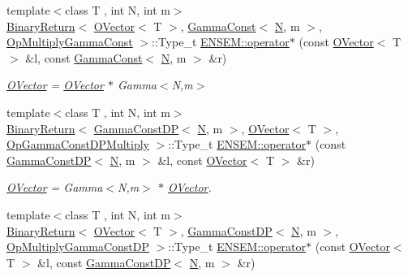 \begin{DoxyCompactItemize}
{\footnotesize template$<$class T , int N, int m$>$ }\\\mbox{\hyperlink{structENSEM_1_1BinaryReturn}{Binary\+Return}}$<$ \mbox{\hyperlink{classENSEM_1_1OVector}{O\+Vector}}$<$ T $>$, \mbox{\hyperlink{classENSEM_1_1GammaConst}{Gamma\+Const}}$<$ \mbox{\hyperlink{adat__devel_2lib_2hadron_2operator__name__util_8cc_a7722c8ecbb62d99aee7ce68b1752f337}{N}}, m $>$, \mbox{\hyperlink{structENSEM_1_1OpMultiplyGammaConst}{Op\+Multiply\+Gamma\+Const}} $>$\+::Type\+\_\+t \mbox{\hyperlink{group__obsvector_ga4cead70d208b90a7a2b58aa6251d78b0}{E\+N\+S\+E\+M\+::operator$\ast$}} (const \mbox{\hyperlink{classENSEM_1_1OVector}{O\+Vector}}$<$ T $>$ \&l, const \mbox{\hyperlink{classENSEM_1_1GammaConst}{Gamma\+Const}}$<$ \mbox{\hyperlink{adat__devel_2lib_2hadron_2operator__name__util_8cc_a7722c8ecbb62d99aee7ce68b1752f337}{N}}, m $>$ \&r)
\begin{DoxyCompactList}\small\item\em \mbox{\hyperlink{classENSEM_1_1OVector}{O\+Vector}} = \mbox{\hyperlink{classENSEM_1_1OVector}{O\+Vector}} $\ast$ Gamma$<$\+N,m$>$ \end{DoxyCompactList}\item 
{\footnotesize template$<$class T , int N, int m$>$ }\\\mbox{\hyperlink{structENSEM_1_1BinaryReturn}{Binary\+Return}}$<$ \mbox{\hyperlink{classENSEM_1_1GammaConstDP}{Gamma\+Const\+DP}}$<$ \mbox{\hyperlink{adat__devel_2lib_2hadron_2operator__name__util_8cc_a7722c8ecbb62d99aee7ce68b1752f337}{N}}, m $>$, \mbox{\hyperlink{classENSEM_1_1OVector}{O\+Vector}}$<$ T $>$, \mbox{\hyperlink{structENSEM_1_1OpGammaConstDPMultiply}{Op\+Gamma\+Const\+D\+P\+Multiply}} $>$\+::Type\+\_\+t \mbox{\hyperlink{group__obsvector_gaa96dcdea35ea89a0405ab2273dfaa9a9}{E\+N\+S\+E\+M\+::operator$\ast$}} (const \mbox{\hyperlink{classENSEM_1_1GammaConstDP}{Gamma\+Const\+DP}}$<$ \mbox{\hyperlink{adat__devel_2lib_2hadron_2operator__name__util_8cc_a7722c8ecbb62d99aee7ce68b1752f337}{N}}, m $>$ \&l, const \mbox{\hyperlink{classENSEM_1_1OVector}{O\+Vector}}$<$ T $>$ \&r)
\begin{DoxyCompactList}\small\item\em \mbox{\hyperlink{classENSEM_1_1OVector}{O\+Vector}} = Gamma$<$\+N,m$>$ $\ast$ \mbox{\hyperlink{classENSEM_1_1OVector}{O\+Vector}}. \end{DoxyCompactList}\item 
{\footnotesize template$<$class T , int N, int m$>$ }\\\mbox{\hyperlink{structENSEM_1_1BinaryReturn}{Binary\+Return}}$<$ \mbox{\hyperlink{classENSEM_1_1OVector}{O\+Vector}}$<$ T $>$, \mbox{\hyperlink{classENSEM_1_1GammaConstDP}{Gamma\+Const\+DP}}$<$ \mbox{\hyperlink{adat__devel_2lib_2hadron_2operator__name__util_8cc_a7722c8ecbb62d99aee7ce68b1752f337}{N}}, m $>$, \mbox{\hyperlink{structENSEM_1_1OpMultiplyGammaConstDP}{Op\+Multiply\+Gamma\+Const\+DP}} $>$\+::Type\+\_\+t \mbox{\hyperlink{group__obsvector_ga5641b8f1bc373f5f46ec47d9b0640c64}{E\+N\+S\+E\+M\+::operator$\ast$}} (const \mbox{\hyperlink{classENSEM_1_1OVector}{O\+Vector}}$<$ T $>$ \&l, const \mbox{\hyperlink{classENSEM_1_1GammaConstDP}{Gamma\+Const\+DP}}$<$ \mbox{\hyperlink{adat__devel_2lib_2hadron_2operator__name__util_8cc_a7722c8ecbb62d99aee7ce68b1752f337}{N}}, m $>$ \&r)

\end{DoxyCompactItemize}
